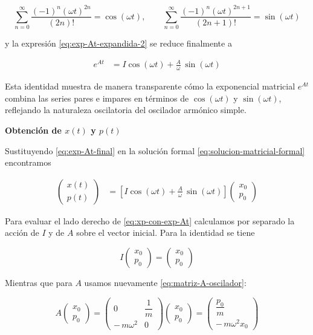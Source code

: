 \documentclass{article}
\begin{document}
\[
\sum_{n=0}^{\infty}
\frac{(-1)^{n}(\omega t)^{2n}}{(2n)!}
= \cos(\omega t),
\qquad
\sum_{n=0}^{\infty}
\frac{(-1)^{n}(\omega t)^{2n+1}}{(2n+1)!}
= \sin(\omega t)
\]

y la expresión \eqref{eq:exp-At-expandida-2} se reduce finalmente a

\begin{equation}
\begin{split}
e^{At}
&= I\cos(\omega t) + \frac{A}{\omega}\,\sin(\omega t)
\end{split}
\label{eq:exp-At-final}
\end{equation}

Esta identidad muestra de manera transparente cómo la exponencial matricial
$e^{At}$ combina las series pares e impares en términos de $\cos(\omega t)$
y $\sin(\omega t)$, reflejando la naturaleza oscilatoria del oscilador
armónico simple.


\bigskip
\textcolor{trueblue}{\textbf{Obtención  de $x(t)$ y $p(t)$}}

Sustituyendo \eqref{eq:exp-At-final} en la solución formal
\eqref{eq:solucion-matricial-formal} encontramos

\begin{equation}
\begin{split}
\begin{pmatrix}
x(t) \\[4pt]
p(t)
\end{pmatrix}
&=
\left[
I\cos(\omega t) + \frac{A}{\omega}\,\sin(\omega t)
\right]
\begin{pmatrix}
x_{0} \\[4pt]
p_{0}
\end{pmatrix}
\end{split}
\label{eq:xp-con-exp-At}
\end{equation}

Para evaluar el lado derecho de \eqref{eq:xp-con-exp-At} calculamos por separado
la acción de $I$ y de $A$ sobre el vector inicial. Para la identidad se tiene

\[
I
\begin{pmatrix}
x_{0} \\[4pt]
p_{0}
\end{pmatrix}
=
\begin{pmatrix}
x_{0} \\[4pt]
p_{0}
\end{pmatrix}
\]

Mientras que para $A$ usamos nuevamente \eqref{eq:matriz-A-oscilador}:

\[
A
\begin{pmatrix}
x_{0} \\[4pt]
p_{0}
\end{pmatrix}
=
\begin{pmatrix}
0 & \dfrac{1}{m} \\[6pt]
-\,m\omega^{2} & 0
\end{pmatrix}
\begin{pmatrix}
x_{0} \\[4pt]
p_{0}
\end{pmatrix}
=
\begin{pmatrix}
\dfrac{p_{0}}{m} \\[6pt]
-\,m\omega^{2}x_{0}
\end{pmatrix}
\]
\end{document}
